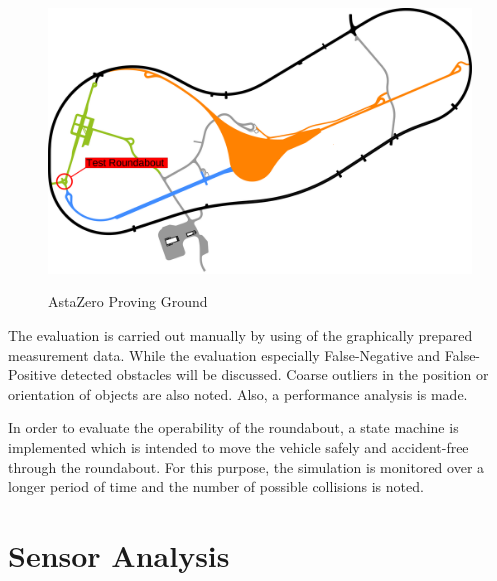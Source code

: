 \documentclass[11pt,oneside,openright]{mpreport}
\begin{document}
\begin{figure}[!ht]
\caption{AstaZero Proving Ground}
\includegraphics[width=\textwidth]{bilder/AstaZero.pdf}
\label{astazero}
\end{figure}


The evaluation is carried out manually by using of the graphically prepared measurement data. 
While the evaluation especially False-Negative and False-Positive detected obstacles will be discussed.
Coarse outliers in the position or orientation of objects are also noted. Also, a performance analysis is made.


In order to evaluate the operability of the roundabout, a state machine is implemented which is intended to move the vehicle safely and accident-free through the roundabout.
For this purpose, the simulation is monitored over a longer period of time and the number of possible collisions is noted.


\chapter{Sensor Analysis}
\end{document}

